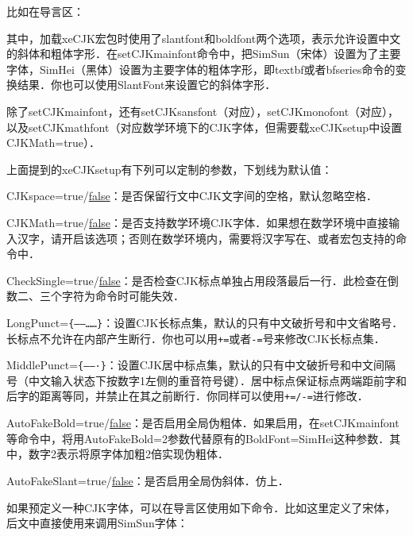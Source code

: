 比如在导言区：
\begin{latex}
\usepackage[slantfont,boldfont]{xeCJK}
\end{latex}

其中，加载xeCJK宏包时使用了slantfont和boldfont两个选项，表示允许设置中文的斜体和粗体字形．在setCJKmainfont命令中，把SimSun（宋体）设置为了主要字体，SimHei（黑体）设置为主要字体的粗体字形，即textbf或者bfseries命令的变换结果．你也可以使用SlantFont来设置它的斜体字形．

除了setCJKmainfont，还有setCJKsansfont（对应），setCJKmonofont（对应），以及setCJKmathfont（对应数学环境下的CJK字体，但需要载xeCJKsetup中设置CJKMath=true）．

上面提到的xeCJKsetup有下列可以定制的参数，下划线为默认值：
\begin{feai}
\item CJKspace=true/\uline{false}：是否保留行文中CJK文字间的空格，默认忽略空格．
\item CJKMath=true/\uline{false}：是否支持数学环境CJK字体．如果想在数学环境中直接输入汉字，请开启该选项；否则在数学环境内，需要将汉字写在、或者宏包支持的命令中．
\item CheckSingle=true/\uline{false}：是否检查CJK标点单独占用段落最后一行．此检查在倒数二、三个字符为命令时可能失效．
\item LongPunct=\verb|{——……}|：设置CJK长标点集，默认的只有中文破折号和中文省略号．长标点不允许在内部产生断行．你也可以用\texttt{+=}或者\texttt{-=}号来修改CJK长标点集．
\item MiddlePunct=\verb|{——·}|：设置CJK居中标点集，默认的只有中文破折号和中文间隔号（中文输入状态下按数字1左侧的重音符号键）．居中标点保证标点两端距前字和后字的距离等同，并禁止在其之前断行．你同样可以使用\texttt{+=/-=}进行修改．
\item AutoFakeBold=true/\uline{false}：是否启用全局伪粗体．如果启用，在setCJKmainfont等命令中，将用AutoFakeBold=2参数代替原有的BoldFont=SimHei这种参数．其中，数字2表示将原字体加粗2倍实现伪粗体．
\item AutoFakeSlant=true/\uline{false}：是否启用全局伪斜体．仿上．
\end{feai}

如果预定义一种CJK字体，可以在导言区使用如下命令．比如这里定义了宋体，后文中直接使用来调用SimSun字体：
\begin{latex}
\newCJKfontfamily[song]
\end{latex}

